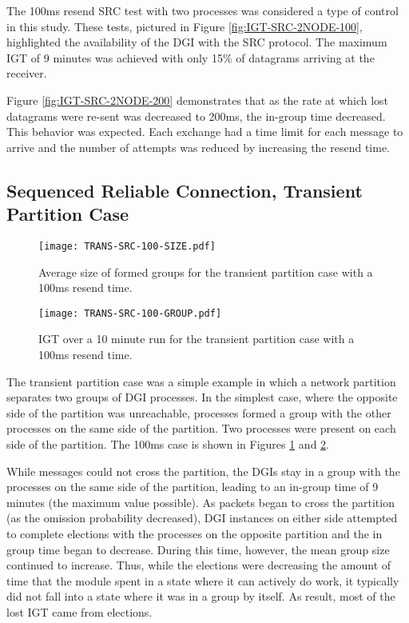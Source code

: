 The 100ms resend SRC test with two processes was considered a type of control in this study.
These tests, pictured in Figure \ref{fig:IGT-SRC-2NODE-100}, highlighted the availability of the DGI with the SRC protocol.
The maximum \ac{IGT} of 9 minutes was achieved with only 15\% of datagrams arriving at the receiver. 

Figure \ref{fig:IGT-SRC-2NODE-200} demonstrates that as the rate at which lost datagrams were re-sent was decreased to 200ms, the in-group time decreased.
This behavior was expected.
Each exchange had a time limit for each message to arrive and the number of attempts was reduced by increasing the resend time.

\subsection{Sequenced Reliable Connection, Transient Partition Case}

\begin{figure}
    \centering
    \texttt{[image: TRANS-SRC-100-SIZE.pdf]}
    \caption{Average size of formed groups for the transient partition case with a 100ms resend time.}
    \label{fig:MGS-SRC-TRANS-100}
\end{figure}%
\begin{figure}
    \centering
    \texttt{[image: TRANS-SRC-100-GROUP.pdf]}
    \caption{\ac{IGT} over a 10 minute run for the transient partition case with a 100ms resend time.}
    \label{fig:IGT-SRC-TRANS-100}
\end{figure}

The transient partition case was a simple example in which a network partition separates two groups of DGI processes.
In the simplest case, where the opposite side of the partition was unreachable, processes formed a group with the other processes on the same side of the partition.
Two processes were present on each side of the partition.
The 100ms case is shown in Figures \ref{fig:MGS-SRC-TRANS-100} and \ref{fig:IGT-SRC-TRANS-100}.

While messages could not cross the partition, the DGIs stay in a group with the processes on the same side of the partition, leading to an in-group time of 9 minutes (the maximum value possible).
As packets began to cross the partition (as the omission probability decreased), DGI instances on either side attempted to complete elections with the processes on the opposite partition and the in group time began to decrease.
During this time, however, the mean group size continued to increase.
Thus, while the elections were decreasing the amount of time that the module spent in a state where it can actively do work, it typically did not fall into a state where it was in a group by itself. 
As result, most of the lost \ac{IGT} came from elections.

